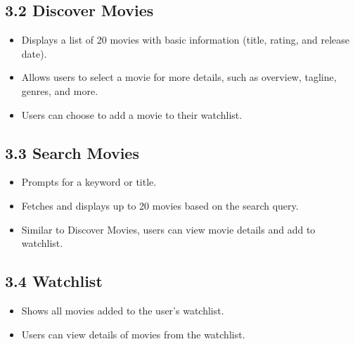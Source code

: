 \documentclass[11pt]{article}
\begin{document}
\subsection*{3.2 Discover Movies}
\begin{itemize}
    \item Displays a list of 20 movies with basic information (title, rating, and release date).
    \item Allows users to select a movie for more details, such as overview, tagline, genres, and more.
    \item Users can choose to add a movie to their watchlist.
\end{itemize}

\subsection*{3.3 Search Movies}
\begin{itemize}
    \item Prompts for a keyword or title.
    \item Fetches and displays up to 20 movies based on the search query.
    \item Similar to Discover Movies, users can view movie details and add to watchlist.
\end{itemize}

\subsection*{3.4 Watchlist}
\begin{itemize}
    \item Shows all movies added to the user’s watchlist.
    \item Users can view details of movies from the watchlist.
\end{itemize}
\end{document}
